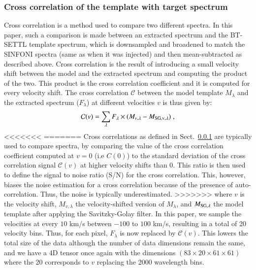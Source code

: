 \documentclass{aa}
\begin{document}
{\subsubsection{Cross correlation of the template with target spectrum}\label{sec: CC algorithm}

Cross correlation is a method used to compare two different spectra.
In this paper, such a comparison is made between an extracted spectrum and the BT-SETTL template spectrum, which is downsampled and broadened to match the SINFONI spectra (same as when it was injected) and then mean-subtracted as described above.
Cross correlation is the result of introducing a small velocity shift between the model and the extracted spectrum and computing the product of the two.
This product is the cross correlation coefficient and it is computed for every velocity shift.
The cross correlation $\mathcal{C}$ between the model template $M_{\lambda}$ and the extracted spectrum ($F_{\lambda}$) at different velocities $v$ is thus given by:
\begin{equation}
    \mathcal{C}(v) = \sum\limits_{\lambda}F_{\rm{\lambda}}\times (M_{v,\lambda}-M_{\rm{SG},v,\lambda})  \; ,
    \label{eq:CC equation}
\end{equation}
<<<<<<<
=======
Cross correlations as defined in Sect.~\ref{sec: CC algorithm} are typically used to compare spectra, by comparing the value of the cross correlation coefficient computed at $v=0$ (i.e $C(0)$) to the standard deviation of the cross correlation signal $\mathcal{C}(v)$ at higher velocity shifts than $0$.
This ratio is then used to define the signal to noise ratio (S/N) for the cross correlation.
This, however, biases the noise estimation for a cross correlation because of the presence of auto-correlation.
Thus, the noise is typically underestimated.
>>>>>>>
where $v$ is the velocity shift, $M_{v,\lambda}$ the velocity-shifted version of $M_{\lambda}$, and $M_{\rm{SG},\lambda}$ the model template after applying the Savitzky-Golay filter.
In this paper, we sample the velocities at every $10$ km/s between $-100$ to $100$ km/s, resulting in a total of 20 velocity bins. Thus, for each pixel, $F_\lambda$ is now replaced by $\mathcal{C}(v)$. This lowers the total size of the data although the number of data dimensions remain the same, and we have a 4D tensor once again with the dimensions $\left(83\times20\times61\times61\right)$ where the 20 corresponds to $v$ replacing the 2000 wavelength bins.


}
\end{document}
